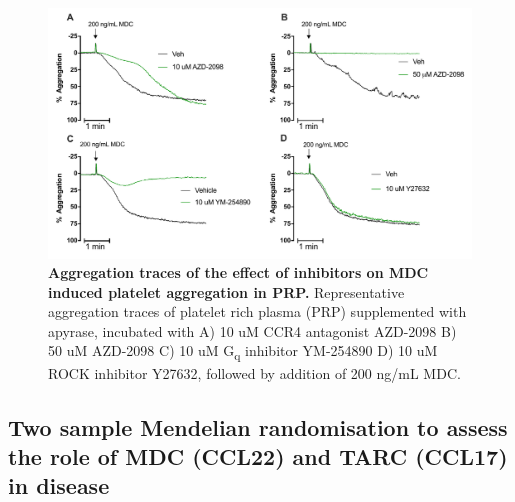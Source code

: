 \documentclass[11pt,twoside]{bristolthesis}
\begin{document}
\begin{figure}

{\centering \includegraphics[width=0.95\linewidth]{figure/Chemokines/Layouts/MDC_inhibitors_aggregation_traces} 

}

\caption[Aggregation traces of the effect of inhibitors on MDC induced platelet aggregation in PRP.]{\textbf{Aggregation traces of the effect of inhibitors on MDC induced platelet aggregation in PRP.} Representative aggregation traces of platelet rich plasma (PRP) supplemented with apyrase, incubated with A) 10 uM CCR4 antagonist AZD-2098 B) 50 uM AZD-2098 C) 10 uM G\textsubscript{q} inhibitor YM-254890 D) 10 uM ROCK inhibitor Y27632, followed by addition of 200 ng/mL MDC.}\label{fig:MDC-PRP-agg-trace}
\end{figure}
\hypertarget{two-sample-mendelian-randomisation-to-assess-the-role-of-mdc-ccl22-and-tarc-ccl17-in-disease}{%
\subsection{Two sample Mendelian randomisation to assess the role of MDC (CCL22) and TARC (CCL17) in disease}\label{two-sample-mendelian-randomisation-to-assess-the-role-of-mdc-ccl22-and-tarc-ccl17-in-disease}}
\end{document}
